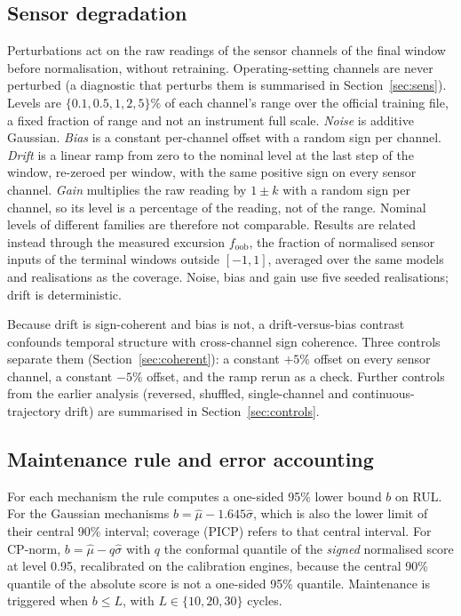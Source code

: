 \subsection{Sensor degradation}
Perturbations act on the raw readings of the sensor channels of the final window before normalisation, without retraining. Operating-setting channels are never perturbed (a diagnostic that perturbs them is summarised in Section~\ref{sec:sens}). Levels are $\{0.1,0.5,1,2,5\}\%$ of each channel's range over the official training file, a fixed fraction of range and not an instrument full scale. \emph{Noise} is additive Gaussian. \emph{Bias} is a constant per-channel offset with a random sign per channel. \emph{Drift} is a linear ramp from zero to the nominal level at the last step of the window, re-zeroed per window, with the same positive sign on every sensor channel. \emph{Gain} multiplies the raw reading by $1\pm k$ with a random sign per channel, so its level is a percentage of the reading, not of the range. Nominal levels of different families are therefore not comparable. Results are related instead through the measured excursion $f_{\mathrm{oob}}$, the fraction of normalised sensor inputs of the terminal windows outside $[-1,1]$, averaged over the same models and realisations as the coverage. Noise, bias and gain use five seeded realisations; drift is deterministic.

Because drift is sign-coherent and bias is not, a drift-versus-bias contrast confounds temporal structure with cross-channel sign coherence. Three controls separate them (Section~\ref{sec:coherent}): a constant $+5\%$ offset on every sensor channel, a constant $-5\%$ offset, and the ramp rerun as a check. Further controls from the earlier analysis (reversed, shuffled, single-channel and continuous-trajectory drift) are summarised in Section~\ref{sec:controls}.

\subsection{Maintenance rule and error accounting}
For each mechanism the rule computes a one-sided 95\% lower bound $b$ on RUL. For the Gaussian mechanisms $b=\hat\mu-1.645\hat\sigma$, which is also the lower limit of their central 90\% interval; coverage (PICP) refers to that central interval. For CP-norm, $b=\hat\mu-q\hat\sigma$ with $q$ the conformal quantile of the \emph{signed} normalised score at level 0.95, recalibrated on the calibration engines, because the central 90\% quantile of the absolute score is not a one-sided 95\% quantile. Maintenance is triggered when $b\le L$, with $L\in\{10,20,30\}$ cycles.

